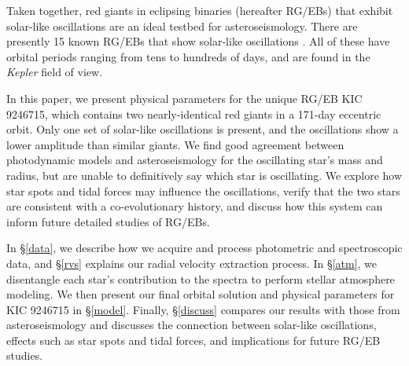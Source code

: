 Taken together, red giants in eclipsing binaries (hereafter RG/EBs) that exhibit solar-like oscillations are an ideal testbed for asteroseismology. There are presently 15 known RG/EBs that show solar-like oscillations \citep{gau13,gau14}. All of these have orbital periods ranging from tens to hundreds of days, and are found in the \emph{Kepler} field of view.

In this paper, we present physical parameters for the unique RG/EB KIC 9246715, which contains two nearly-identical red giants in a 171-day eccentric orbit. Only one set of solar-like oscillations is present, and the oscillations show a lower amplitude than similar giants. We find good agreement between photodynamic models and asteroseismology for the oscillating star's mass and radius, but are unable to definitively say which star is oscillating.
We explore how star spots and tidal forces may influence the oscillations, verify that the two stars are consistent with a co-evolutionary history, and discuss how this system can inform future detailed studies of RG/EBs.

In \S \ref{data}, we describe how we acquire and process photometric and spectroscopic data, and \S \ref{rvs} explains our radial velocity extraction process. In \S \ref{atm}, we disentangle each star's contribution to the spectra to perform stellar atmosphere modeling. We then present our final orbital solution and physical parameters for KIC 9246715 in \S \ref{model}. Finally, \S \ref{discuss} compares our results with those from asteroseismology and discusses the connection between solar-like oscillations, effects such as star spots and tidal forces, and implications for future RG/EB studies.
